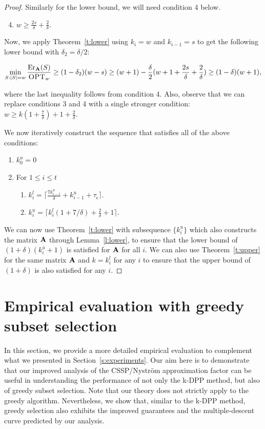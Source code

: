 \documentclass{article}
\begin{document}
\begin{proof}
Similarly for the lower bound, we will need condition 4 below.
\begin{enumerate}
  \setcounter{enumi}{3}

	\item $w \geq \frac{ 2s}{\delta} +\frac{2}{\delta}$.
\end{enumerate}
 Now, we apply Theorem~\ref{t:lower} using $k_i=w$ and $k_{i-1}=s$ to get the following lower bound with $\delta_2 = \delta/2$: 

\[\min_{S:|S|=w}\frac{\mathrm{Er}_\mathbf A(S)}{\textsc{OPT}_w}\geq (1-\delta_2) (w- s) \geq (w + 1) - \frac{\delta}{2} (w+ 1 + \frac{2s}{\delta} + \frac{2}{\delta}) \geq (1-\delta) (w+1),   \]

where the last inequality follows from condition 4. Also, observe that
we can replace conditions 3 and 4 with a single stronger condition: $w \geq k(1 + \frac{7}{\delta}) + 1+ \frac{2}{\delta}$.

We now iteratively construct the sequence that satisfies all of the
above conditions:
\begin{enumerate}
\item $k^u_0 = 0 $
\item For $1 \leq i \leq t$ 
  \begin{enumerate}
  \item $k^l_i =  \big\lceil\frac{7k^u_{i-1}}{\delta}  + k^u_{i-1} + \tau_\epsilon \big\rceil$.
  \item $k^u_i = \lceil k^l_i (1 + 7/\delta) + \frac{2}{\delta} + 1\rceil$. 
  \end{enumerate}
\end{enumerate}                
We can now use Theorem~\ref{t:lower} with subsequence
$\{k^u_i\}$ which also constructs the matrix $\mathbf A$ through
Lemma~\ref{l:lower}, to ensure that the lower bound of
$(1+\delta)(k^u_i+1)$ is satisfied for $\mathbf A$ for all $i$. We
can also use Theorem~\ref{t:upper} for the same matrix $\mathbf A$
and $k=k^l_i$ for any $i$ to ensure that the upper bound of
$(1+\delta)$ is also satisfied for any $i$. 
 \end{proof}

 \section{Empirical evaluation with greedy subset selection}
 \label{a:greedy}
 In this section, we provide a more detailed empirical evaluation to
 complement what we presented in Section~\ref{s:experiments}. Our aim here is to demonstrate
that our improved analysis of the CSSP/Nystr\"om approximation factor
can be useful in understanding the performance of not only the k-DPP
method, but also of greedy subset selection. Note that our theory
does not strictly apply to the greedy algorithm. Nevertheless, we show
that, similar to the k-DPP method, greedy selection also exhibits the
improved guarantees and the multiple-descent curve predicted by our
analysis.  
\end{document}
